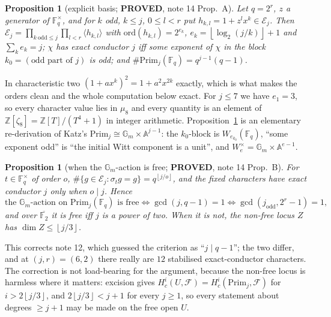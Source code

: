 \documentclass[10pt]{article}
\theoremstyle{plain}
\newtheorem{proposition}[theorem]{Proposition}
\theoremstyle{definition}
\newcommand{\F}{\mathbb F}
\newcommand{\Z}{\mathbb Z}
\newcommand{\E}{\mathcal E}
\newcommand{\flr}[1]{\left\lfloor #1\right\rfloor}
\newcommand{\Prim}{\mathrm{Prim}}
\newcommand{\proved}{\textcolor{proved}{\textsf{\textbf{\footnotesize PROVED}}}}
\begin{document}
\begin{proposition}[explicit basis; \proved, note 14 Prop.~A]\label{prop:basisA}
Let $q=2^r$, $z$ a generator of $\F_q^{\times}$, and for $k$ odd, $k\le j$,
$0\le l<r$ put $h_{k,l}=1+z^lx^k\in\E_j$. Then
$\E_j=\prod_{k\ \mathrm{odd}\le j}\prod_{l<r}\langle h_{k,l}\rangle$ with
$\mathrm{ord}(h_{k,l})=2^{e_k}$, $e_k=\flr{\log_2(j/k)}+1$ and $\sum_ke_k=j$;
$\chi$ has exact conductor $j$ iff some exponent of $\chi$ in the block
$k_0=(\text{odd part of }j)$ is odd; and $\#\Prim_j(\F_q)=q^{j-1}(q-1)$.
\end{proposition}

In characteristic two $(1+ax^k)^2=1+a^2x^{2k}$ exactly, which is what makes the
orders clean and the whole computation below exact. For $j\le7$ we have
$e_1=3$, so every character value lies in $\mu_8$ and every quantity is an
element of $\Z[\zeta_8]=\Z[T]/(T^4+1)$ in integer arithmetic.
Proposition~\ref{prop:basisA} is an elementary re-derivation of Katz's
$\Prim_j\cong\mathbb G_m\times\mathbb A^{j-1}$: the $k_0$-block is
$W_{e_{k_0}}(\F_q)$, ``some exponent odd'' is ``the initial Witt component is a
unit'', and $W_e^{\times}=\mathbb G_m\times\mathbb A^{e-1}$.

\begin{proposition}[when the $\mathbb G_m$-action is free; \proved, note 14
Prop.~B]\label{prop:free}
For $t\in\F_q^{\times}$ of order $o$, $\#\{g\in\E_j:\sigma_tg=g\}=q^{\flr{j/o}}$,
and the fixed characters have exact conductor $j$ only when $o\mid j$. Hence
\[
 \text{the }\mathbb G_m\text{-action on }\Prim_j(\F_q)\text{ is free}
 \iff \gcd(j,q-1)=1 \iff \gcd(j_{\mathrm{odd}},2^r-1)=1,
\]
and over $\overline{\F_2}$ it is free iff $j$ is a power of two. When it is not,
the non-free locus $Z$ has $\dim Z\le\flr{j/3}$.
\end{proposition}

This corrects note 12, which guessed the criterion as ``$j\mid q-1$''; the two
differ, and at $(j,r)=(6,2)$ there really are $12$ stabilised
exact-conductor characters. The correction is not load-bearing for the
argument, because the non-free locus is harmless where it matters: excision
gives $H^i_c(U,\mathcal F)=H^i_c(\Prim_j,\mathcal F)$ for
$i>2\flr{j/3}$, and $2\flr{j/3}<j+1$ for every $j\ge1$, so every statement
about degrees $\ge j+1$ may be made on the free open $U$.
\end{document}
